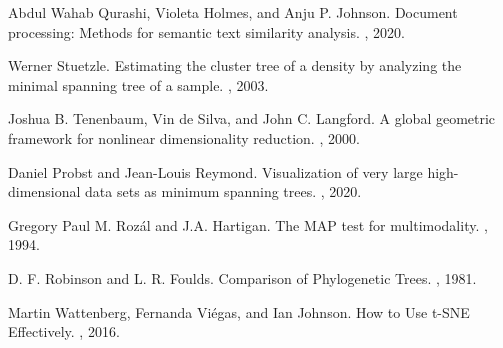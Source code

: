 \documentclass{article}
\begin{document}
\begin{thebibliography}{10}
Abdul Wahab Qurashi, Violeta Holmes, and Anju P. Johnson.
\newblock Document processing: Methods for semantic text similarity analysis.
, 2020.

Werner Stuetzle.
\newblock Estimating the cluster tree of a density by analyzing the minimal spanning tree of a sample.
, 2003.

Joshua B. Tenenbaum, Vin de Silva, and John C. Langford.
\newblock A global geometric framework for nonlinear dimensionality reduction.
, 2000.

Daniel Probst and Jean-Louis Reymond.
\newblock Visualization of very large high-dimensional data sets as minimum spanning trees.
, 2020.

Gregory Paul M. Roz\'al and J.A. Hartigan.
\newblock The MAP test for multimodality.
, 1994.

D. F. Robinson and L. R. Foulds.
\newblock Comparison of Phylogenetic Trees.
, 1981.

Martin Wattenberg, Fernanda Vi\'egas, and Ian Johnson.
\newblock How to Use t-SNE Effectively.
, 2016.

\end{thebibliography}
\end{document}
